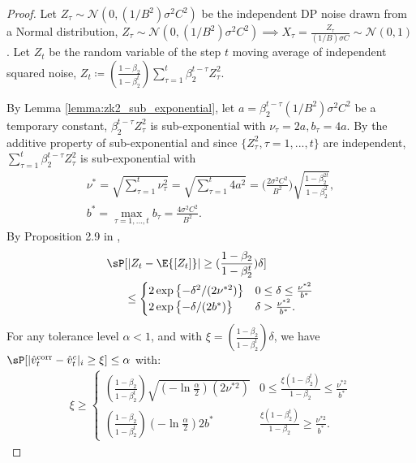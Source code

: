 \documentclass[letterpaper]{article} %
\def\cN{\mathcal{N}}
\begin{document}
\begin{proof}
Let $Z_{\tau} \sim \cN(0, (1/B^2)\sigma^2 C^2)$ be the independent DP noise drawn from a Normal distribution,
$Z_{\tau} \sim \cN(0, (1/B^2)\sigma^2 C^2) \implies X_{\tau} = \frac{Z_{\tau}}{(1/B)\sigma C} \sim \cN(0,1)$.
Let $Z_t$ be the random variable of the step $t$ moving average of independent squared noise, $Z_t \coloneqq (\frac{1-\beta_2}{1-\beta_2^t})\sum_{\tau=1}^{t} \beta_2^{t-\tau} Z_\tau^2$.

By Lemma \ref{lemma:zk2_sub_exponential}, let $a=\beta_{2}^{t-\tau}(1/B^2)\sigma^2C^2$ be a temporary constant, $\beta_2^{t-\tau}Z_\tau^2$ is sub-exponential with $\nu_{\tau}=2a, b_{\tau}=4a$.
By the additive property of sub-exponential and since $\{Z_\tau^2, \tau={1, ..., t}\}$ are independent, $\sum_{\tau=1}^{t}\beta_2^{t-\tau}Z_{\tau}^2$ is sub-exponential with
\begin{gather*}
    \nu^{*} =\sqrt{\sum_{\tau=1}^{t} \nu_{\tau}^2} = \sqrt{\sum_{\tau=1}^{t} 4a^2} = \bigg(\frac{2\sigma^2C^2}{B^2}\bigg)\sqrt{\frac{1-\beta_2^{2t}}{1-\beta_2^2}}, \\
    b^{*} = \max_{\tau=1,...,t}b_\tau = \frac{4\sigma^2C^2}{B^2}.
\end{gather*}
By Proposition 2.9 in \citet{wainwright2019high},
\begin{align*}
    \sP&[\lvert Z_t - \E{[Z_t]} \rvert  \geq (\frac{1-\beta_2}{1-\beta_2^t}) \delta] \\
    &\leq
    \begin{cases}
      2\exp{ \bigl\{ -\delta^2/(2\nu^{*2}) \bigl\} } & 0 \leq \delta \leq \frac{\nu^{*2}}{b^{*}} \\
      2\exp{ \bigl\{ -\delta/(2b^{*}) \bigl\} } & \delta > \frac{\nu^{*2}}{b^{*}}.
   \end{cases}
\end{align*}
For any tolerance level $\alpha < 1$, and with $\xi = (\frac{1-\beta_2}{1-\beta_2^t}) \delta$, we have $\sP[\lvert
 \hat{v}_t^{\textnormal{corr}} - \hat{v}_t^c \rvert_i \geq \xi ] \leq \alpha$ with:
\begin{align*}
    \xi \geq
    \begin{cases}
        (\frac{1-\beta_2}{1-\beta_2^t}) \sqrt{(-\ln{\frac{\alpha}{2}})(2\nu^{*2})}
        & 0 \leq \frac{\xi(1-\beta_2^t)}{1-\beta_2}  \leq \frac{\nu^{*2}}{b^{*}} \\
        (\frac{1-\beta_2}{1-\beta_2^t}) (-\ln{\frac{\alpha}{2}})2b^{*}
        & \frac{\xi(1-\beta_2^t)}{1-\beta_2}    \geq \frac{\nu^{*2}}{b^{*}}.
    \end{cases}
\end{align*}
\end{proof}
\end{document}
